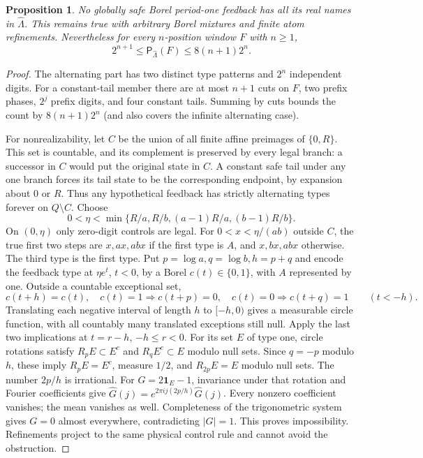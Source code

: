 \documentclass[11pt,reqno]{amsart}
\numberwithin{equation}{section}
\newtheorem{proposition}[theorem]{Proposition}
\theoremstyle{definition}
\newcommand{\Patt}{\mathsf P}
\newcommand{\one}{\mathbf 1}
\begin{document}
\begin{proposition}\label{prop:alternation}
No globally safe Borel period-one feedback has all its real names
in $\widehat\Lambda$. This remains true with arbitrary Borel
mixtures and finite atom refinements. Nevertheless for every
$n$-position window $F$ with $n\ge1$,
\[
 2^{n+1}\le\Patt_{\widehat\Lambda}(F)\le8(n+1)2^n.
\]
\end{proposition}
\begin{proof}
The alternating part has two distinct type patterns and $2^n$
independent digits. For a constant-tail member there are at most
$n+1$ cuts on $F$, two prefix phases, $2^j$ prefix digits, and
four constant tails. Summing by cuts bounds the count by
$8(n+1)2^n$ (and also covers the infinite alternating case).

For nonrealizability, let $C$ be the union of all finite affine
preimages of $\{0,R\}$. This set is countable, and its complement is preserved by every
legal branch: a successor in $C$ would put the original state in $C$. A constant safe tail under any one
branch forces its tail state to be the corresponding endpoint,
by expansion about $0$ or $R$. Thus any hypothetical feedback
has strictly alternating types forever on $Q\setminus C$.
Choose
\[
 0<\eta<\min\{R/a,R/b,(a-1)R/a,(b-1)R/b\}.
\]
On $(0,\eta)$ only zero-digit controls are legal. For
$0<x<\eta/(ab)$ outside $C$, the true first two steps are
$x,ax,abx$ if the first type is $A$, and $x,bx,abx$ otherwise.
The third type is the first type. Put $p=\log a,q=\log b,h=p+q$
and encode the feedback type at $\eta e^t$, $t<0$, by a Borel
$c(t)\in\{0,1\}$, with $A$ represented by one. Outside a
countable exceptional set,
\[
 c(t+h)=c(t),\quad
 c(t)=1\Rightarrow c(t+p)=0,\quad
 c(t)=0\Rightarrow c(t+q)=1\qquad(t<-h).
\]
Translating each negative interval of length $h$ to $[-h,0)$
gives a measurable circle function, with all countably many
translated exceptions still null. Apply the last two implications
at $t=r-h$, $-h\le r<0$. For its set $E$ of type one, circle
rotations satisfy $R_pE\subset E^c$ and $R_qE^c\subset E$
modulo null sets. Since $q=-p$ modulo $h$, these imply
$R_pE=E^c$, measure $1/2$, and $R_{2p}E=E$ modulo null sets.
The number $2p/h$ is irrational. For
$G=2\one_E-1$, invariance under that rotation and Fourier
coefficients give
$\widehat G(j)=e^{2\pi i j(2p/h)}\widehat G(j)$.
Every nonzero coefficient vanishes; the mean vanishes as well.
Completeness of the trigonometric system gives $G=0$ almost
everywhere, contradicting $|G|=1$. This proves impossibility.
Refinements project to the same physical control rule and cannot
avoid the obstruction.
\end{proof}
\end{document}
